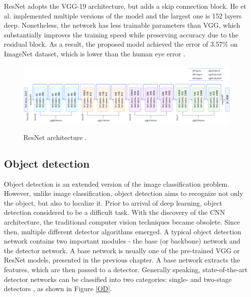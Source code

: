 ResNet adopts the VGG-19 architecture, but adds a skip connection block. He et al. implemented multiple versions of the model and the largest one is 152 layers deep. Nonetheless, the network has less trainable parameters than VGG, which substantially improves the training speed while preserving accuracy due to the residual block. As a result, the proposed model achieved the error of 3.57\% on ImageNet dataset, which is lower than the human eye error \cite{He2015}.

\begin{figure}[htb]
	\begin{center}
		\includegraphics[width=16cm]{./resnetFull.png}
	\end{center}
	\caption{ResNet architecture \cite{resnet50}.}
	\begin{center}
		\label{resnetFull}
	\end{center}
\end{figure}
\FloatBarrier


\subsection{Object detection}
\label{obj_detection_section} 
Object detection is an extended version of the image classification problem. However, unlike image classification, object detection aims to recognize not only the object, but also to localize it. Prior to arrival of deep learning, object detection considered to be a difficult task. With the discovery of the CNN architecture, the traditional computer vision techniques became obsolete. Since then, multiple different detector algorithms emerged. A typical object detection network contains two important modules - the base (or backbone) network  and the detector network. A base network is usually one of the pre-trained VGG or ResNet models, presented in the previous chapter. A base network extracts the features,  which are then passed to a detector. Generally speaking, state-of-the-art detector networks can be classified into two categories: single- and two-stage detectors \cite{Zaidi2021}, as shown in Figure \ref{OD}.  

